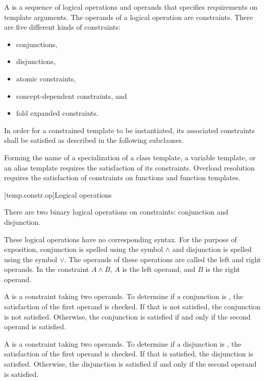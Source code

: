\pnum
A  is a sequence of logical operations and
operands that specifies requirements on template arguments.
The operands of a logical operation are constraints.
There are five different kinds of constraints:
\begin{itemize}
\item conjunctions,
\item disjunctions,
\item atomic constraints,
\item concept-dependent constraints, and
\item fold expanded constraints.
\end{itemize}

\pnum
In order for a constrained template to be instantiated,
its associated constraints
shall be satisfied as described in the following subclauses.
\begin{note}
Forming the name of a specialization of
a class template,
a variable template, or
an alias template
requires the satisfaction of its constraints.
Overload resolution
requires the satisfaction of constraints
on functions and function templates.
\end{note}

[temp.constr.op]{Logical operations}

\pnum
There are two binary logical operations on constraints: conjunction
and disjunction.
\begin{note}
These logical operations have no corresponding \Cpp{} syntax.
For the purpose of exposition, conjunction is spelled
using the symbol $\land$ and disjunction is spelled using the
symbol $\lor$.
The operands of these operations are called the left
and right operands. In the constraint $A \land B$,
$A$ is the left operand, and $B$ is the right operand.
\end{note}

\pnum
A  is a constraint taking two
operands.
To determine if a conjunction is
,
the satisfaction of
the first operand is checked.
If that is not satisfied, the conjunction is not satisfied.
Otherwise, the conjunction is satisfied if and only if the second
operand is satisfied.

\pnum
A  is a constraint taking two
operands.
%
To determine if a disjunction is
,
the satisfaction of
the first operand is checked.
If that is satisfied, the disjunction is satisfied.
Otherwise, the disjunction is satisfied if and only if the second
operand is satisfied.

